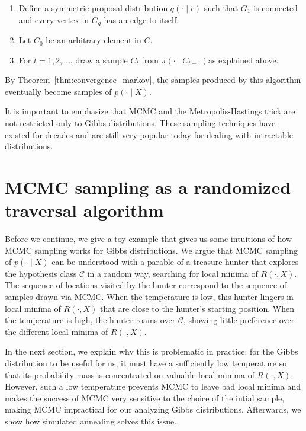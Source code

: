 \begin{enumerate}
\item Define a symmetric proposal distribution $q(\cdot \mid c)$ such that $G_1$ is
connected and every vertex in $G_q$ has an edge to itself.
\item Let $C_0$ be an arbitrary element in $C$.
\item For $t = 1, 2, \ldots$, draw a sample $C_t$ from $\pi(\cdot \mid C_{t-1})$as explained
above.
\end{enumerate}

By Theorem~\ref{thm:convergence_markov}, the samples produced by this algorithm eventually become
samples of $p(\cdot \mid X)$.

It is important to emphasize that MCMC and the Metropolis-Hastings
trick are not restricted only to Gibbs distributions. These sampling techniques
have existed for decades and are still very popular today for dealing
with intractable distributions.

\section{MCMC sampling as a randomized traversal algorithm}
\label{sec:mcmc_traversal}

Before we continue, we give a toy example that gives us some intuitions
of how MCMC sampling works for Gibbs distributions. We argue that
MCMC sampling of $p(\cdot \mid X)$ can be understood with a parable of a treasure
hunter that explores the hypothesis class $\mathcal{C}$ in a random way, searching
for local minima of $R(\cdot, X)$. The sequence of locations visited by the hunter
correspond to the sequence of samples drawn via MCMC. When the temperature
is low, this hunter lingers in local minima of $R(\cdot, X)$ that are close
to the hunter's starting position. When the temperature is high, the hunter
roams over $\mathcal{C}$, showing little preference over the different local minima of $R(\cdot, X)$.

In the next section, we explain why this is problematic in practice: for
the Gibbs distribution to be useful for us, it must have a sufficiently low
temperature so that its probability mass is concentrated on valuable local
minima of $R(\cdot, X)$. However, such a low temperature prevents MCMC to
leave bad local minima and makes the success of MCMC very sensitive to
the choice of the intial sample, making MCMC impractical for our analyzing
Gibbs distributions. Afterwards, we show how simulated annealing solves
this issue.

